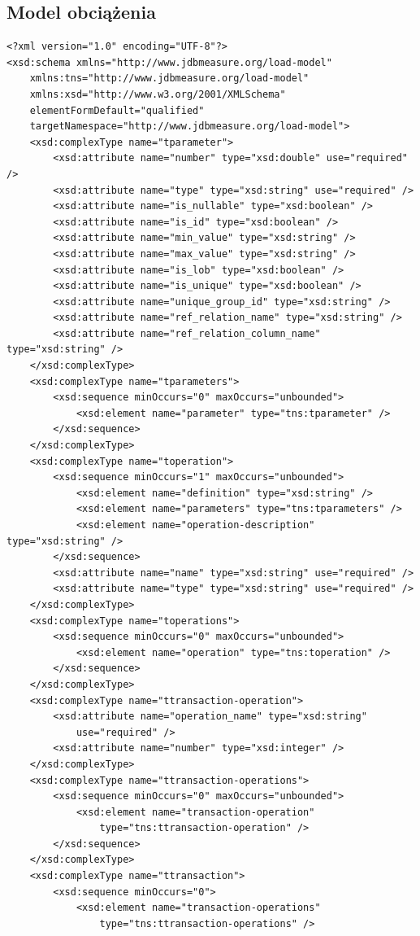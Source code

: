 \subsection{Model obciążenia}
\begin{Verbatim}
<?xml version="1.0" encoding="UTF-8"?>
<xsd:schema xmlns="http://www.jdbmeasure.org/load-model"
	xmlns:tns="http://www.jdbmeasure.org/load-model"
	xmlns:xsd="http://www.w3.org/2001/XMLSchema"
	elementFormDefault="qualified"
	targetNamespace="http://www.jdbmeasure.org/load-model">
	<xsd:complexType name="tparameter">
		<xsd:attribute name="number" type="xsd:double" use="required" />
		<xsd:attribute name="type" type="xsd:string" use="required" />
		<xsd:attribute name="is_nullable" type="xsd:boolean" />
		<xsd:attribute name="is_id" type="xsd:boolean" />
		<xsd:attribute name="min_value" type="xsd:string" />
		<xsd:attribute name="max_value" type="xsd:string" />
		<xsd:attribute name="is_lob" type="xsd:boolean" />
		<xsd:attribute name="is_unique" type="xsd:boolean" />
		<xsd:attribute name="unique_group_id" type="xsd:string" />
		<xsd:attribute name="ref_relation_name" type="xsd:string" />
		<xsd:attribute name="ref_relation_column_name" type="xsd:string" />
	</xsd:complexType>
	<xsd:complexType name="tparameters">
		<xsd:sequence minOccurs="0" maxOccurs="unbounded">
			<xsd:element name="parameter" type="tns:tparameter" />
		</xsd:sequence>
	</xsd:complexType>
	<xsd:complexType name="toperation">
		<xsd:sequence minOccurs="1" maxOccurs="unbounded">
			<xsd:element name="definition" type="xsd:string" />
			<xsd:element name="parameters" type="tns:tparameters" />
			<xsd:element name="operation-description" type="xsd:string" />
		</xsd:sequence>
		<xsd:attribute name="name" type="xsd:string" use="required" />
		<xsd:attribute name="type" type="xsd:string" use="required" />
	</xsd:complexType>
	<xsd:complexType name="toperations">
		<xsd:sequence minOccurs="0" maxOccurs="unbounded">
			<xsd:element name="operation" type="tns:toperation" />
		</xsd:sequence>
	</xsd:complexType>
	<xsd:complexType name="ttransaction-operation">
		<xsd:attribute name="operation_name" type="xsd:string" 
			use="required" />
		<xsd:attribute name="number" type="xsd:integer" />
	</xsd:complexType>
	<xsd:complexType name="ttransaction-operations">
		<xsd:sequence minOccurs="0" maxOccurs="unbounded">
			<xsd:element name="transaction-operation" 
				type="tns:ttransaction-operation" />
		</xsd:sequence>
	</xsd:complexType>
	<xsd:complexType name="ttransaction">
		<xsd:sequence minOccurs="0">
			<xsd:element name="transaction-operations" 
				type="tns:ttransaction-operations" />

\end{Verbatim}
